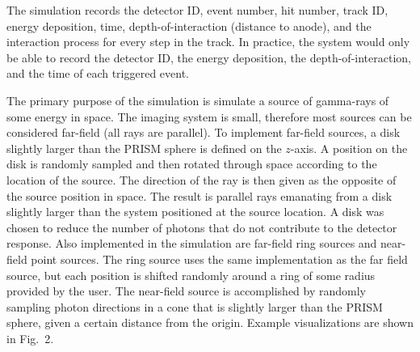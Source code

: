 \documentclass[10pt]{article}
\begin{document}
%

The simulation records the detector ID, event number, hit number, track ID, energy deposition, time, depth-of-interaction (distance to anode), and the interaction process for every step in the track. In practice, the system would only be able to record the detector ID, the energy deposition, the depth-of-interaction, and the time of each triggered event. 

The primary purpose of the simulation is simulate a source of gamma-rays of some energy in space. The imaging system is small, therefore most sources can be considered far-field (all rays are parallel). To implement far-field sources, a disk slightly larger than the PRISM sphere is defined on the $z$-axis. A position on the disk is randomly sampled and then rotated through space according to the location of the source. The direction of the ray is then given as the opposite of the source position in space. The result is parallel rays emanating from a disk slightly larger than the system positioned at the source location. A disk was chosen to reduce the number of photons that do not contribute to the detector response. Also implemented in the simulation are far-field ring sources and near-field point sources. The ring source uses the same implementation as the far field source, but each position is shifted randomly around a ring of some radius provided by the user. The near-field source is accomplished by randomly sampling photon directions in a cone that is slightly larger than the PRISM sphere, given a certain distance from the origin. Example visualizations are shown in Fig.~2.
\end{document}
